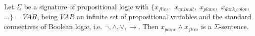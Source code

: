 \begin{example}\label{ex:sigma-sentence}
Let $\Sigma$ be a signature of propositional logic 
with $\{x_{\textit{flies}},$ $x_{\textit{animal}},$ $x_{\textit{plane}},$ $x_{\textit{dark\_color}},$ $\ldots\} = \textit{VAR}$, being $\textit{VAR}$ an infinite set of propositional variables and the standard connectives of Boolean logic, i.e. $\neg,\wedge,\vee,\rightarrow$. Then $x_{\textit{plane}} \wedge x_{\textit{flies}}$ is a $\Sigma$-sentence.
\end{example}









